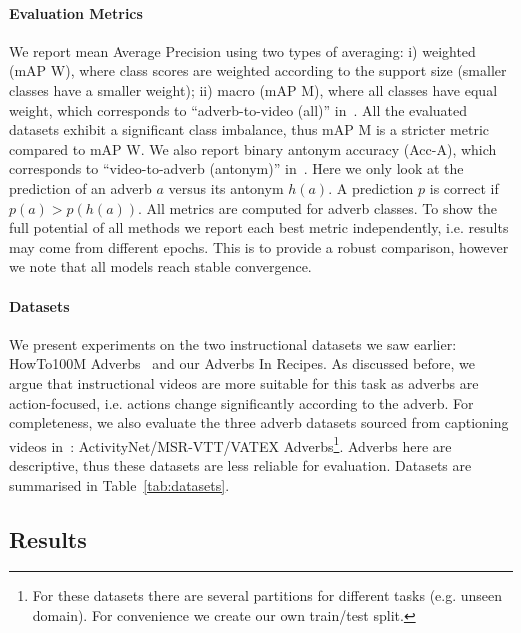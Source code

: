 \documentclass[10pt,twocolumn,letterpaper]{article}
\newcommand{\fparagraph}[1]{\paragraph{#1}}
\begin{document}
\fparagraph{Evaluation Metrics}
We report mean Average Precision using two types of averaging: i) weighted (mAP W), where class scores are weighted according to the support size (smaller classes have a smaller weight); ii) macro (mAP M), where all classes have equal weight, which corresponds to ``adverb-to-video (all)'' in~\cite{doughty2020action}. All the evaluated datasets exhibit a significant class imbalance, thus mAP M is a stricter metric compared to mAP W. 
We also report binary antonym accuracy (Acc-A), which corresponds to ``video-to-adverb (antonym)'' in~\cite{doughty2020action}. Here we only look at the prediction of an adverb $a$ versus its antonym $h(a)$. A prediction $p$ is correct if $p(a) > p(h(a))$. All metrics are computed for adverb classes.
To show the full potential of all methods we report each best metric independently, i.e. results may come from different epochs. 
This is to provide a robust comparison, however we note that all models reach stable convergence. 

\vspace{-13pt}

\fparagraph{Datasets}
We present experiments on the two instructional datasets we saw earlier: HowTo100M Adverbs~\cite{doughty2020action} and our Adverbs In Recipes. As discussed before, we argue that instructional videos are more suitable for this task as adverbs are action-focused, i.e. actions change significantly according to the adverb. For completeness, we also evaluate the three adverb datasets sourced from captioning videos in~\cite{doughty2022you}: ActivityNet/MSR-VTT/VATEX Adverbs\footnote{For these datasets there are several partitions for different tasks (e.g. unseen domain). For convenience we create our own train/test split.}. Adverbs here are  
descriptive, thus 
these datasets are less reliable for evaluation.
Datasets are summarised in Table~\ref{tab:datasets}. 

\vspace{-3pt}
\subsection{Results}
\end{document}

